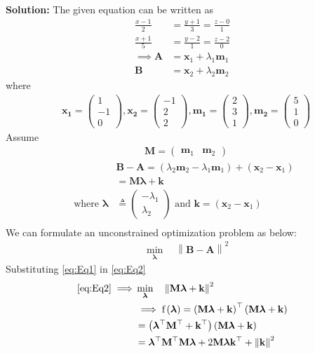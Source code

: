 \documentclass[12pt]{article}
\providecommand{\brak}[1]{\ensuremath{\left(#1\right)}}
\providecommand{\norm}[1]{\left\lVert#1\right\rVert}
\newcommand{\solution}{\noindent \textbf{Solution: }}
\newcommand{\myvec}[1]{\ensuremath{\begin{pmatrix}#1\end{pmatrix}}}
\let\vec\mathbf
\begin{document}
\begin{enumerate}
\solution 
The given equation can be written as
\begin{align}
	\frac{x-1}{2} &= \frac{y+1}{3}=\frac{z-0}{1}\\ 
	\frac{x+1}{5} &= \frac{y-2}{1}= \frac{z-2}{0} \\ 
	\implies 
	\vec{A} &= \vec{x}_1 + \lambda_1\vec{m}_1\\
	\vec{B} &= \vec{x}_2 + \lambda_2\vec{m}_2
\end{align}	
where
\begin{align}
	&\vec{x_1} = \myvec{1\\-1\\0},  
	\vec{x_2} = \myvec{-1\\2\\2},  
	\vec{m_1} = \myvec{2\\3\\1},
	\vec{m_2} = \myvec{5\\1\\0}  
\end{align}	
Assume
\begin{align}
	&\vec{M} = \myvec{\vec{m}_1 & \vec{m}_2} 
\end{align}
\begin{align}
	&\vec{B}-\vec{A} = \brak{\lambda_2\vec{m}_2 - \lambda_1\vec{m}_1} + \brak{\vec{x}_2- \vec{x}_1} \\ 
	\label{eq:Eq1}
	&= \vec{M}\bm{\lambda}+ \vec{k} \\
	\text{ where } \bm{\lambda} &\triangleq \myvec{-\lambda_1\\ \lambda_2}\text{ and }\vec{k} =\brak{\vec{x}_2- \vec{x}_1}  \\
\end{align}
We can formulate an unconstrained optimization problem as below:
\begin{align}
	\label{eq:Eq2}
	&  \min_{\bm{\lambda}} \quad \norm{\vec{B}-\vec{A}}^2 
\end{align}
Substituting \eqref{eq:Eq1} in \eqref{eq:Eq2}
\begin{align}
	\eqref{eq:Eq2} \implies 
	&  \min_{\bm{\lambda}} \quad \norm{\vec{M}\bm{\lambda}+\vec{k}}^2 \\ 
	&\implies \text{f}\brak{\bm{\lambda}} = \brak{\vec{M}\bm{\lambda}+\vec{k}}^\top\brak{\vec{M}\bm{\lambda}+\vec{k}} \\
	&= \brak{\bm{\lambda}^\top\vec{M}^\top+\vec{k}^\top}\brak{\vec{M}\bm{\lambda}+\vec{k}} \\
	\label{eq:Eq4} 
	&= \bm{\lambda}^\top\vec{M}^\top\vec{M}\bm{\lambda}+2\vec{M}\bm{\lambda}\vec{k}^\top+ \norm{\vec{k}}^2 

\end{align}
\end{enumerate}
\end{document}

